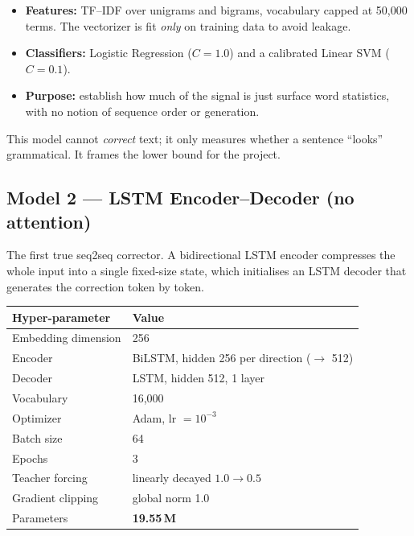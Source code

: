 \documentclass[11pt,a4paper]{article}
\begin{document}
\begin{itemize}[noitemsep]
  \item \textbf{Features:} TF--IDF over unigrams and bigrams, vocabulary capped
        at 50{,}000 terms. The vectorizer is fit \emph{only} on training data to
        avoid leakage.
  \item \textbf{Classifiers:} Logistic Regression ($C=1.0$) and a calibrated
        Linear SVM ($C=0.1$).
  \item \textbf{Purpose:} establish how much of the signal is just surface
        word statistics, with no notion of sequence order or generation.
\end{itemize}

This model cannot \emph{correct} text; it only measures whether a sentence
``looks'' grammatical. It frames the lower bound for the project.

\subsection{Model 2 --- LSTM Encoder--Decoder (no attention)}
\label{sec:m2}
The first true seq2seq corrector. A bidirectional LSTM encoder compresses the
whole input into a single fixed-size state, which initialises an LSTM decoder
that generates the correction token by token.

\begin{center}
\begin{tabular}{ll}
\toprule
Hyper-parameter & Value \\
\midrule
Embedding dimension      & 256 \\
Encoder                  & BiLSTM, hidden 256 per direction ($\rightarrow$ 512) \\
Decoder                  & LSTM, hidden 512, 1 layer \\
Vocabulary               & 16{,}000 \\
Optimizer                & Adam, lr $=10^{-3}$ \\
Batch size               & 64 \\
Epochs                   & 3 \\
Teacher forcing          & linearly decayed $1.0 \rightarrow 0.5$ \\
Gradient clipping        & global norm 1.0 \\
Parameters               & \textbf{19.55\,M} \\
\bottomrule
\end{tabular}
\end{center}
\end{document}
